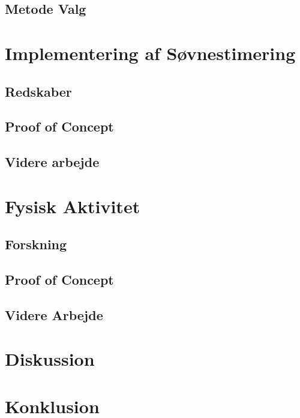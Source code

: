\section{Metode Valg}\label{sec:metodevalg}



\chapter{Implementering af Søvnestimering}

\section{Redskaber}\label{sec:redskaber}


\section{Proof of Concept}


\label{sec:verisoevn}
\section{Videre arbejde}\label{sec:videre-arbejde}








\chapter{Fysisk Aktivitet}

\section{Forskning}

\section{Proof of Concept}

\section{Videre Arbejde}\label{sec:videre-arbejde-fa}


\chapter{Diskussion}\label{chap:bigdisc}


\chapter{Konklusion}




\label{bib:mybiblio}

\appendix

